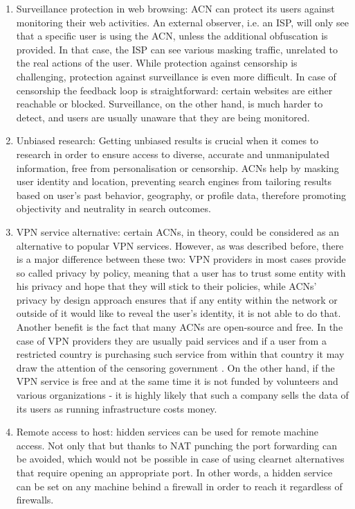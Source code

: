 \begin{enumerate}
    \item Surveillance protection in web browsing: ACN can protect its users against monitoring their web activities. An external observer, i.e. an ISP, will only see that a specific user is using the ACN, unless the additional obfuscation is provided. In that case, the ISP can see various masking traffic, unrelated to the real actions of the user. 
    While protection against censorship is challenging, protection against surveillance is even more difficult. In case of censorship the feedback loop is straightforward: certain websites are either reachable or blocked. Surveillance, on the other hand, is much harder to detect, and users are usually unaware that they are being monitored.
    \item Unbiased research: Getting unbiased results is crucial when it comes to research in order to ensure access to diverse, accurate and unmanipulated information, free from personalisation or censorship. ACNs help by masking user identity and location, preventing search engines from tailoring results based on user’s past behavior, geography, or profile data, therefore promoting objectivity and neutrality in search outcomes.
    \item VPN service alternative: certain ACNs, in theory, could be considered as an alternative to popular VPN services. However, as was described before, there is a major difference between these two: VPN providers in most cases provide so called privacy by policy, meaning that a user has to trust some entity with his privacy and hope that they will stick to their policies, while ACNs’ privacy by design approach ensures that if any entity within the network or outside of it would like to reveal the user’s identity, it is not able to do that.
    Another benefit is the fact that many ACNs are open-source and free. In the case of VPN providers they are usually paid services and if a user from a restricted country is purchasing such service from within that country it may draw the attention of the censoring government \cite{russia}. On the other hand, if the VPN service is free and at the same time it is not funded by volunteers and various organizations - it is highly likely that such a company sells the data of its users as running infrastructure costs money.
    \item Remote access to host: hidden services can be used for remote machine access. Not only that but thanks to NAT punching the port forwarding can be avoided, which would not be possible in case of using clearnet alternatives that require opening an appropriate port. In other words, a hidden service can be set on any machine behind a firewall in order to reach it regardless of firewalls.

\end{enumerate}
